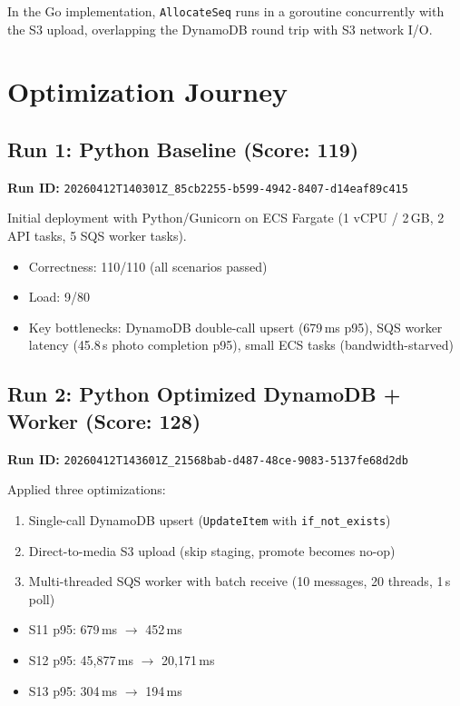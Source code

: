 \documentclass[11pt]{article}
\begin{document}
In the Go implementation, \texttt{AllocateSeq} runs in a goroutine concurrently with the S3 upload, overlapping the DynamoDB round trip with S3 network I/O.

\section{Optimization Journey}

\subsection{Run 1: Python Baseline (Score: 119)}

\textbf{Run ID:} \texttt{20260412T140301Z\_85cb2255-b599-4942-8407-d14eaf89c415}

Initial deployment with Python/Gunicorn on ECS Fargate (1 vCPU / 2\,GB, 2 API tasks, 5 SQS worker tasks).

\begin{itemize}
    \item Correctness: 110/110 (all scenarios passed)
    \item Load: 9/80
    \item Key bottlenecks: DynamoDB double-call upsert (679\,ms p95), SQS worker latency (45.8\,s photo completion p95), small ECS tasks (bandwidth-starved)
\end{itemize}

\subsection{Run 2: Python Optimized DynamoDB + Worker (Score: 128)}

\textbf{Run ID:} \texttt{20260412T143601Z\_21568bab-d487-48ce-9083-5137fe68d2db}

Applied three optimizations:
\begin{enumerate}
    \item Single-call DynamoDB upsert (\texttt{UpdateItem} with \texttt{if\_not\_exists})
    \item Direct-to-media S3 upload (skip staging, promote becomes no-op)
    \item Multi-threaded SQS worker with batch receive (10 messages, 20 threads, 1\,s poll)
\end{enumerate}

\begin{itemize}
    \item S11 p95: 679\,ms $\rightarrow$ 452\,ms
    \item S12 p95: 45,877\,ms $\rightarrow$ 20,171\,ms
    \item S13 p95: 304\,ms $\rightarrow$ 194\,ms
\end{itemize}
\end{document}
